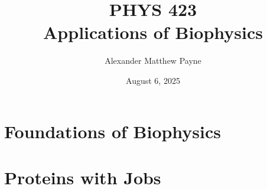 \documentclass[]{report}
\title{PHYS 423 \\ \normalsize Applications of Biophysics}
\author{Alexander Matthew Payne}
\date{August 6, 2025} %
\begin{document}
\maketitle
\tableofcontents

\part{Foundations of Biophysics}





\part{Proteins with Jobs}


\printbibliography
\end{document}
